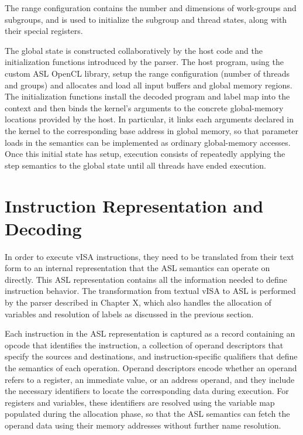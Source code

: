 The range configuration contains the number and dimensions of work-groups and
subgroups, and is used to initialize the subgroup and thread states, along with
their special registers.

The global state is constructed collaboratively by the host code and the
initialization functions introduced by the parser. The host program, using the
custom ASL OpenCL library, setup the range configuration (number of threads and
groups) and allocates and load all input buffers and global memory regions. The
initialization functions install the decoded program and label map into the
context and then binds the kernel’s arguments to the concrete global-memory
locations provided by the host. In particular, it links each arguments declared
in the kernel to the corresponding base address in global memory, so that
parameter loads in the semantics can be implemented as ordinary global-memory
accesses. Once this initial state has setup, execution consists of repeatedly
applying the step semantics to the global state until all threads have ended
execution.

\section{Instruction Representation and Decoding}

In order to execute vISA instructions, they need to be translated from their
text form to an internal representation that the ASL semantics can operate on
directly. This ASL representation contains all the information needed to define
instruction behavior. The transformation from textual vISA to ASL is performed
by the parser described in Chapter X, which also handles the allocation of
variables and resolution of labels as discussed in the previous section.

Each instruction in the ASL representation is captured as a record containing
an opcode that identifies the instruction, a collection of operand descriptors
that specify the sources and destinations, and instruction-specific qualifiers
that define the semantics of each operation. Operand descriptors encode whether
an operand refers to a register, an immediate value, or an address operand, and
they include the necessary identifiers to locate the corresponding data during
execution. For registers and variables, these identifiers are resolved using
the variable map populated during the allocation phase, so that the ASL
semantics can fetch the operand data using their memory addresses without
further name resolution.

